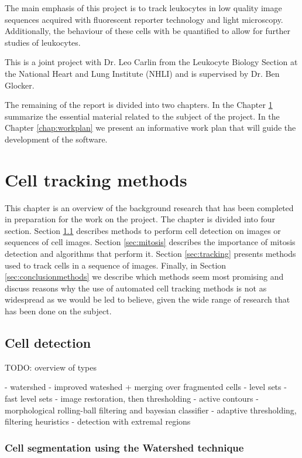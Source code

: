 \documentclass[12pt,a4paper,openany]{book}
\begin{document}
The main emphasis of this project is to track leukocytes in low quality image sequences acquired with fluorescent reporter technology and light microscopy. Additionally, the behaviour of these cells with be quantified to allow for further studies of leukocytes.

This is a joint project with Dr. Leo Carlin from the Leukocyte Biology Section at the National Heart and Lung Institute (NHLI) and is supervised by Dr. Ben Glocker.

The remaining of the report is divided into two chapters. In the Chapter \ref{chap:methodoverview} summarize the essential material related to the subject of the project. In the Chapter \ref{chap:workplan} we present an informative work plan that will guide the development of the software. 



\chapter{Cell tracking methods}
\label{chap:methodoverview}

This chapter is an overview of the background research that has been completed in preparation for the work on the project. The chapter is divided into four section. Section \ref{sec:detection} describes methods to perform cell detection on images or sequences of cell images. Section \ref{sec:mitosis} describes the importance of mitosis detection and algorithms that perform it. Section \ref{sec:tracking} presents methods used to track cells in a sequence of images. Finally, in Section \ref{sec:conclusionmethods} we describe which methods seem most promising and discuss reasons why the use of automated cell tracking methods is not as widespread as we would be led to believe, given the wide range of research that has been done on the subject.


\section{Cell detection}
\label{sec:detection}

TODO: overview of types

- watershed
- improved wateshed + merging over fragmented cells
- level sets
- fast level sets
- image restoration, then thresholding
- active contours
- morphological rolling-ball filtering and bayesian classifier
- adaptive thresholding, filtering heuristics
- detection with extremal regions

\subsection{Cell segmentation using the Watershed technique}
\end{document}
